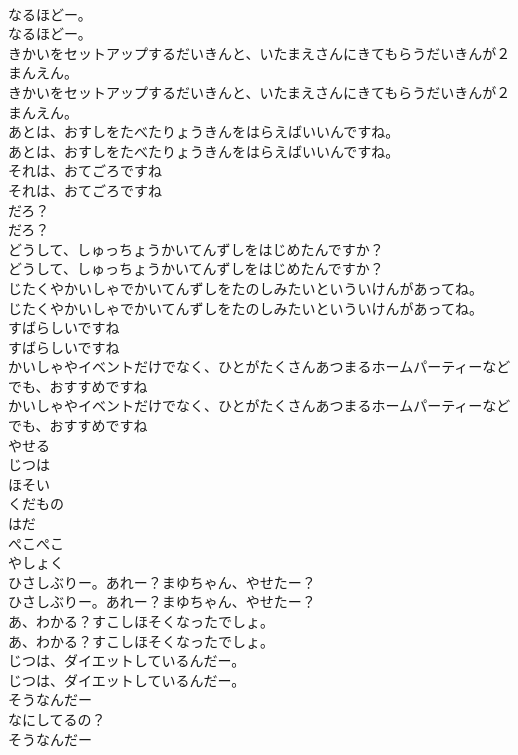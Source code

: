 \documentclass[8pt]{extreport}
\begin{document}
\begin{CJK}{UTF8}{min}
\\	なるほどー。
\\	なるほどー。
\\	きかいをセットアップするだいきんと、いたまえさんにきてもらうだいきんが２まんえん。
\\	きかいをセットアップするだいきんと、いたまえさんにきてもらうだいきんが２まんえん。
\\	あとは、おすしをたべたりょうきんをはらえばいいんですね。
\\	あとは、おすしをたべたりょうきんをはらえばいいんですね。
\\	それは、おてごろですね
\\	それは、おてごろですね
\\	だろ？
\\	だろ？
\\	どうして、しゅっちょうかいてんずしをはじめたんですか？
\\	どうして、しゅっちょうかいてんずしをはじめたんですか？
\\	じたくやかいしゃでかいてんずしをたのしみたいといういけんがあってね。
\\	じたくやかいしゃでかいてんずしをたのしみたいといういけんがあってね。
\\	すばらしいですね
\\	すばらしいですね
\\	かいしゃやイベントだけでなく、ひとがたくさんあつまるホームパーティーなどでも、おすすめですね
\\	かいしゃやイベントだけでなく、ひとがたくさんあつまるホームパーティーなどでも、おすすめですね
\\	やせる
\\	じつは
\\	ほそい
\\	くだもの
\\	はだ
\\	ぺこぺこ
\\	やしょく
\\	ひさしぶりー。あれー？まゆちゃん、やせたー？
\\	ひさしぶりー。あれー？まゆちゃん、やせたー？
\\	あ、わかる？すこしほそくなったでしょ。
\\	あ、わかる？すこしほそくなったでしょ。
\\	じつは、ダイエットしているんだー。
\\	じつは、ダイエットしているんだー。
\\	そうなんだー
\\	なにしてるの？
\\	そうなんだー

\end{CJK}
\end{document}
